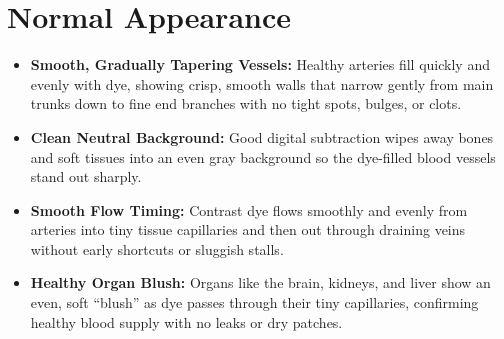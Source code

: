 \section{Normal Appearance}
\begin{itemize}
\item \textbf{Smooth, Gradually Tapering Vessels:} Healthy arteries fill quickly and evenly with dye, showing crisp, smooth walls that narrow gently from main trunks down to fine end branches with no tight spots, bulges, or clots.
\item \textbf{Clean Neutral Background:} Good digital subtraction wipes away bones and soft tissues into an even gray background so the dye-filled blood vessels stand out sharply.
\item \textbf{Smooth Flow Timing:} Contrast dye flows smoothly and evenly from arteries into tiny tissue capillaries and then out through draining veins without early shortcuts or sluggish stalls.
\item \textbf{Healthy Organ Blush:} Organs like the brain, kidneys, and liver show an even, soft ``blush'' as dye passes through their tiny capillaries, confirming healthy blood supply with no leaks or dry patches.
\end{itemize}

